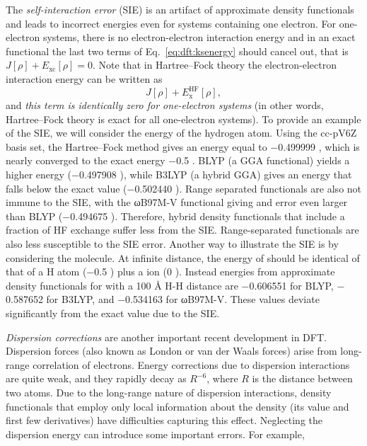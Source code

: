 \documentclass[../Main/chem371-notes.tex]{subfiles}
\begin{document}
The \emph{self-interaction error} (SIE) is an artifact of approximate density functionals and leads to incorrect energies even for systems containing one electron. 
For one-electron systems, there is no electron-electron interaction energy and in an exact functional the last two terms of Eq.~\eqref{eq:dft:ksenergy} should cancel out, that is $J[\rho] + E_\mathrm{xc}[\rho] = 0$.
Note that in Hartree--Fock theory the electron-electron interaction energy can be written as
\begin{equation}
J[\rho] + E_\mathrm{x}^\mathrm{HF}[\rho],
\end{equation}
and \emph{this term is identically zero for one-electron systems} (in other words, Hartree--Fock theory is exact for all one-electron systems).
To provide an example of the SIE, we will consider the energy of the hydrogen atom.
Using the cc-pV6Z basis set, the Hartree--Fock method gives an energy equal to $-$0.499999 \Eh, which is nearly converged to the exact energy $-$0.5 \Eh.
BLYP (a GGA functional) yields a higher energy ($-$0.497908 \Eh), while B3LYP (a hybrid GGA) gives an energy that falls below the exact value ($-$0.502440 \Eh).
Range separated functionals are also not immune to the SIE, with the ωB97M-V functional giving and error even larger than BLYP ($-$0.494675 \Eh).
Therefore, hybrid density functionals that include a fraction of HF exchange suffer less from the SIE.
Range-separated functionals are also less susceptible to the SIE error.
Another way to illustrate the SIE is by considering the  molecule.
At infinite distance, the energy of  should be identical of that of a H atom ($-$0.5 \Eh) plus a  ion (0 \Eh).
Instead energies from approximate density functionals for  with a 100 \AA{} H-H distance are $-$0.606551 \Eh for BLYP, $-$0.587652 \Eh for B3LYP, and $-$0.534163 \Eh for ωB97M-V.
These values deviate significantly from the exact value due to the SIE.

\emph{Dispersion corrections} are another important recent development in DFT.
Dispersion forces (also known as London or van der Waals forces) arise from long-range correlation of electrons.
Energy corrections due to dispersion interactions are quite weak, and they rapidly decay as $R^{-6}$, where $R$ is the distance between two atoms.
Due to the long-range nature of dispersion interactions, density functionals that employ only local information about the density (its value and first few derivatives) have difficulties capturing this effect.
Neglecting the dispersion energy can introduce some important errors.
For example, 
\end{document}
